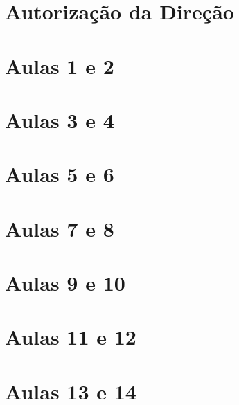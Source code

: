 

\begin{apendicesenv}

    \partapendices
    \chapter{Autorização da Direção} \label{ApendiceA} 
    \chapter{Aulas 1 e 2} \label{ApendiceB} 
    \chapter{Aulas 3 e 4} \label{ApendiceC} 
    \chapter{Aulas 5 e 6} \label{ApendiceD} 
    \chapter{Aulas 7 e 8} \label{ApendiceE} 
    \chapter{Aulas 9 e 10} \label{ApendiceF} 
    \chapter{Aulas 11 e 12} \label{ApendiceG} 
    \chapter{Aulas 13 e 14} \label{ApendiceH} 

\end{apendicesenv}
